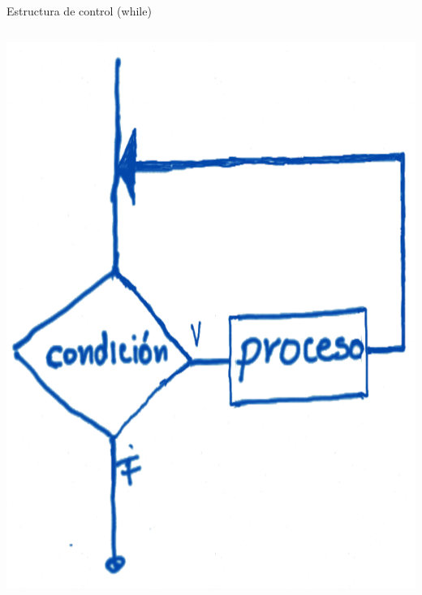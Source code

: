 \documentclass[presentation, aspectratio=54]{beamer}
\begin{document}
\begin{frame}[label={sec:orgfe21858}]{Estructura de control (while)}
\begin{columns}
\begin{column}{0.4\columnwidth}
\begin{center}
\includegraphics[width=.9\linewidth]{./images/codigo/for.png}
\end{center}
\end{column}


\end{columns}
\end{frame}
\end{document}
